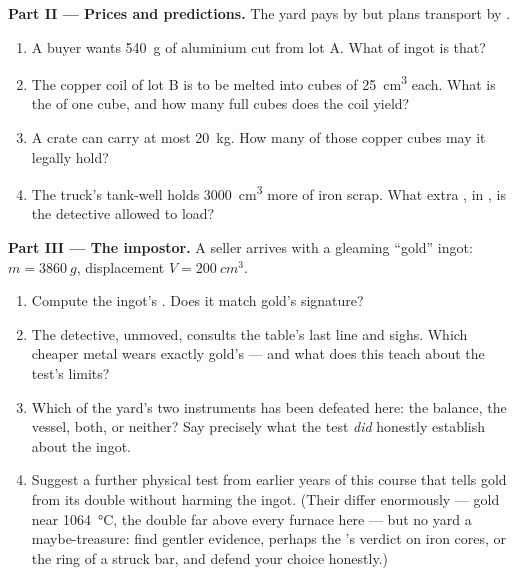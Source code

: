 \begin{problem}
\medskip\noindent\textbf{Part II --- Prices and predictions.}
The yard pays by  but plans transport by .
\begin{enumerate}[resume]
  \item A buyer wants \qty{540}{g} of aluminium cut from lot A.
        What  of ingot is that?
  \item The copper coil of lot B is to be melted into cubes of
        \qty{25}{cm^3} each. What is the  of one cube, and
        how many full cubes does the coil yield?
  \item A crate can carry at most \qty{20}{kg}. How many of
        those copper cubes may it legally hold?
  \item The truck's tank-well holds \qty{3000}{cm^3} more of
        iron scrap. What extra , in , is the
        detective allowed to load?
\end{enumerate}

\medskip\noindent\textbf{Part III --- The impostor.}
A seller arrives with a gleaming ``gold'' ingot:
$m = \qty{3860}{g}$, displacement $V = \qty{200}{cm^3}$.
\begin{enumerate}[resume]
  \item Compute the ingot's . Does it match gold's
        signature?
  \item The detective, unmoved, consults the table's last line
        and sighs. Which cheaper metal wears exactly gold's
         --- and what does this teach about the 
        test's limits?
  \item Which of the yard's two instruments has been defeated
        here: the balance, the vessel, both, or neither? Say
        precisely what the  test \emph{did} honestly
        establish about the ingot.
  \item Suggest a further physical test from earlier years of
        this course that tells gold from its double without
        harming the ingot. (Their  differ
        enormously --- gold near \qty{1064}{\celsius}, the
        double far above every furnace here --- but no yard
         a maybe-treasure: find gentler evidence, perhaps
        the 's verdict on iron cores, or the ring of a
        struck bar, and defend your choice honestly.)
\end{enumerate}


\end{problem}

